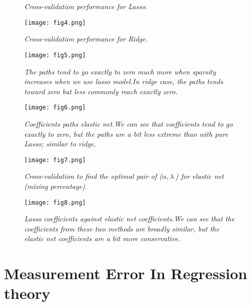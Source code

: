 \documentclass[12pt]{report}
\begin{document}
\begin{itemize}
\begin{figure}
\begin{minipage}[c]{0.49\textwidth}
			\caption{\textit{Cross-validation performance for Lasso.}}
		\end{minipage}
		\hfill
		\begin{minipage}[c]{0.49\textwidth}
			\centering
			\texttt{[image: fig4.png]}
			\caption{\textit{Cross-validation performance for Ridge.}}
		\end{minipage}
	\end{figure}
	\begin{figure}
	\begin{minipage}[c]{0.49\textwidth}
		\centering
		\texttt{[image: fig5.png]}
		
		\caption[Ridge versus Lasso coefficients paths]{\textit{The paths tend to go exactly to zero much more when sparsity increases when we use lasso model.In ridge case, the paths tends toward zero but less commonly reach exactly zero.}}
	\end{minipage}
	\hfill
	\begin{minipage}[c]{0.49\textwidth}
		\centering
		\texttt{[image: fig6.png]}
		\caption[Coefficients paths elastic net]{\textit{Coefficients paths elastic net.We can see that coefficients tend to go exactly to zero, but the paths are a bit less extreme than with pure Lasso; similar to ridge.}}
	\end{minipage}
\end{figure}
	\begin{figure}
	\begin{minipage}[c]{0.49\textwidth}
		\centering
		\texttt{[image: fig7.png]}
		
		\caption[Cross-validation for elastic net regression]{\textit{Cross-validation to find the optimal pair of ($\alpha,\lambda\ $) for elastic net (mixing percentage).}}
	\end{minipage}
	\hfill
	\begin{minipage}[c]{0.49\textwidth}
		\centering
		\texttt{[image: fig8.png]}
		\caption[Lasso coefficients against elastic net coefficients]{\textit{Lasso coefficients against elastic net coefficients.We can see that the coefficients from these two methods are broadly similar, but the elastic net coefficients are a bit more conservative.}}
	\end{minipage}
\end{figure}
\end{itemize}

	\chapter{Measurement Error In Regression theory }
\end{document}

